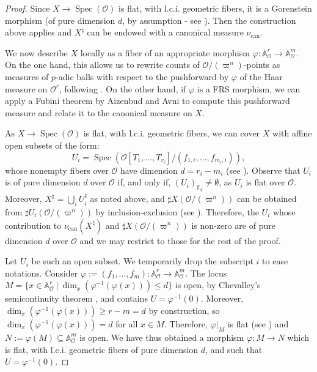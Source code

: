 \documentclass[11pt,english]{article}
\numberwithin{equation}{section}
\numberwithin{figure}{section}
\theoremstyle{definition}
\theoremstyle{plain}
\theoremstyle{remark}
\DeclareMathOperator{\Spec}{Spec}
\begin{document}
\begin{proof}

Since $X\rightarrow\Spec(\mathcal{O})$ is flat, with l.c.i. geometric
fibers, it is a Gorenstein morphism (of pure dimension $d$, by assumption
- see \cite[\href{https://stacks.math.columbia.edu/tag/0C02}{Tag 0C02}]{SP}).
Then the construction above applies and $X^{\natural}$ can be endowed
with a canonical measure $\nu_{\mathrm{can}}$.

We now describe $X$ locally as a fiber of an appropriate morphism
$\varphi:\mathbb{A}_{\mathcal{O}}^{r}\rightarrow\mathbb{A}_{\mathcal{O}}^{m}$.
On the one hand, this allows us to rewrite counts of $\mathcal{O}/(\varpi^{n})$-points
as measures of $p$-adic balls with respect to the pushforward by
$\varphi$ of the Haar measure on $\mathcal{O}^{r}$, following \cite[\S 4.2.]{Wys17b}.
On the other hand, if $\varphi$ is a FRS morphism, we can apply a
Fubini theorem by Aizenbud and Avni \cite[Thm. 3.16.]{AA16} to compute
this pushforward measure and relate it to the canonical measure on
$X$.

As $X\rightarrow\Spec(\mathcal{O})$ is flat, with l.c.i. geometric
fibers, we can cover $X$ with affine open subsets of the form: \[
U_i=\Spec(\mathcal{O}[T_1,\ldots,T_{r_i}]/(f_{1,i},\ldots,f_{m_i,i})),
\] whose nonempty fibers over $\mathcal{O}$ have dimension $d=r_{i}-m_{i}$
(see \cite[\href{https://stacks.math.columbia.edu/tag/01UB}{Tag 01UB}]{SP}).
Observe that $U_{i}$ is of pure dimension $d$ over $\mathcal{O}$
if, and only if, $(U_{i})_{\mathbb{F}_{q}}\ne\emptyset$, as $U_{i}$
is flat over $\mathcal{O}$. Moreover, $X^{\natural}=\bigcup_{i}U_{i}^{\natural}$
as noted above, and $\sharp X(\mathcal{O}/(\varpi^{n}))$ can be obtained
from $\sharp U_{i}(\mathcal{O}/(\varpi^{n}))$ by inclusion-exclusion
(see \cite[Lem. 3.1.1.]{AA18}). Therefore, the $U_{i}$ whose contribution
to $\nu_{\mathrm{can}}(X^{\natural})$ and $\sharp X(\mathcal{O}/(\varpi^{n}))$
is non-zero are of pure dimension $d$ over $\mathcal{O}$ and we
may restrict to those for the rest of the proof.

Let $U_{i}$ be such an open subset. We temporarily drop the subscript
$i$ to ease notations. Consider $\varphi:=(f_{1},\ldots,f_{m}):\mathbb{A}_{\mathcal{O}}^{r}\rightarrow\mathbb{A}_{\mathcal{O}}^{m}$.
The locus $M=\{x\in\mathbb{A}_{\mathcal{O}}^{r}\ \vert\ \dim_{x}(\varphi^{-1}(\varphi(x)))\leq d\}$
is open, by Chevalley's semicontinuity theorem \cite[Thm. 13.1.3.]{Gro66},
and contains $U=\varphi^{-1}(0)$. Moreover, $\dim_{x}(\varphi^{-1}(\varphi(x)))\geq r-m=d$
by construction, so $\dim_{x}(\varphi^{-1}(\varphi(x)))=d$ for all
$x\in M$. Therefore, $\varphi\vert_{M}$ is flat (see \cite[Prop. 6.1.5.]{Gro65})
and $N:=\varphi(M)\subseteq\mathbb{A}_{\mathcal{O}}^{m}$ is open.
We have thus obtained a morphism $\varphi:M\rightarrow N$ which is
flat, with l.c.i. geometric fibers of pure dimension $d$, and such
that $U=\varphi^{-1}(0)$.


\end{proof}
\end{document}
